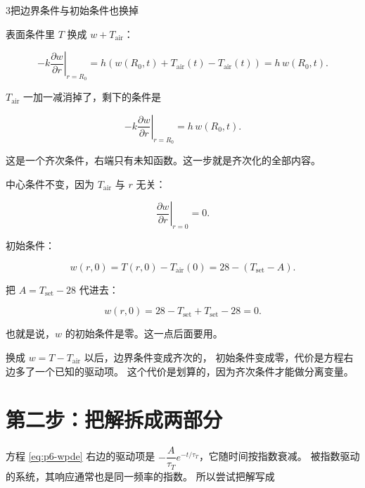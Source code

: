 \begin{stepbox}{3}{把边界条件与初始条件也换掉}

表面条件里 $T$ 换成 $w+T_{\mathrm{air}}$：

\begin{equation}
-k\left.\frac{\partial w}{\partial r}\right|_{r=R_0}
=h\left(w(R_0,t)+T_{\mathrm{air}}(t)-T_{\mathrm{air}}(t)\right)
=h\,w(R_0,t).
\end{equation}

$T_{\mathrm{air}}$ 一加一减消掉了，剩下的条件是

\begin{equation}
-k\left.\frac{\partial w}{\partial r}\right|_{r=R_0}=h\,w(R_0,t).
\label{eq:p6-wbc}
\end{equation}

这是一个齐次条件，右端只有未知函数。这一步就是齐次化的全部内容。

中心条件不变，因为 $T_{\mathrm{air}}$ 与 $r$ 无关：

\begin{equation}
\left.\frac{\partial w}{\partial r}\right|_{r=0}=0 .
\label{eq:p6-wbc0}
\end{equation}

初始条件：

\begin{equation}
w(r,0)=T(r,0)-T_{\mathrm{air}}(0)=28-\left(T_{\mathrm{set}}-A\right).
\end{equation}

把 $A=T_{\mathrm{set}}-28$ 代进去：

\begin{equation}
w(r,0)=28-T_{\mathrm{set}}+T_{\mathrm{set}}-28=0 .
\label{eq:p6-wic}
\end{equation}

也就是说，$w$ 的初始条件是零。这一点后面要用。

\end{stepbox}

\begin{keypoint}
换成 $w=T-T_{\mathrm{air}}$ 以后，边界条件变成齐次的，
初始条件变成零，代价是方程右边多了一个已知的驱动项。
这个代价是划算的，因为齐次条件才能做分离变量。
\end{keypoint}

\section{第二步：把解拆成两部分}

方程 \eqref{eq:p6-wpde} 右边的驱动项是
$-\dfrac{A}{\tau_T}e^{-t/\tau_T}$，它随时间按指数衰减。
被指数驱动的系统，其响应通常也是同一频率的指数。
所以尝试把解写成

